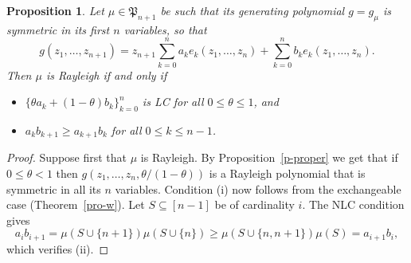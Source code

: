 \documentclass[10pt,reqno]{amsart}
\theoremstyle{plain}
\newtheorem{proposition}[theorem]{Proposition}
\theoremstyle{definition}
\theoremstyle{remark}
\newcommand{\fP}{\mathfrak{P}}
\begin{document}
\begin{proposition}\label{RAS}
Let $\mu\in\fP_{n+1}$ be such that its generating polynomial $g=g_\mu$ is 
symmetric in its first $n$ variables, so that
$$
g(z_1,\ldots,z_{n+1})= z_{n+1}\sum_{k=0}^{n}a_ke_k(z_1,\ldots, z_n)+
\sum_{k=0}^{n}b_ke_k(z_1,\ldots, z_n).
$$
Then $\mu$ is Rayleigh if and only if 
\begin{itemize} 
\item[(i)] $\{\theta a_k + (1-\theta) b_k\}_{k=0}^n$ is LC 
for all $0 \leq \theta \leq 1$, and 
\item[(ii)] $a_kb_{k+1} \geq a_{k+1}b_k$ for all $0 \leq k \leq n-1$. 
\end{itemize}
\end{proposition}
\begin{proof}
Suppose first that $\mu$ is Rayleigh. By Proposition~\ref{p-proper} we get 
that if
$0 \leq \theta < 1$ then
$g(z_1, \ldots, z_n,\theta/(1-\theta))$ is a Rayleigh polynomial that is 
symmetric in all its $n$ variables. Condition (i) now follows from the 
exchangeable case (Theorem~\ref{pro-w}).  
Let $S \subseteq [n-1]$ be of cardinality $i$.
The NLC condition gives 
$$
a_ib_{i+1} = \mu(S \cup \{n+1\})\mu(S \cup \{n\}) \geq 
\mu(S \cup \{n,n+1\})\mu(S)= a_{i+1}b_i, 
$$
which verifies (ii). 


\end{proof}
\end{document}
